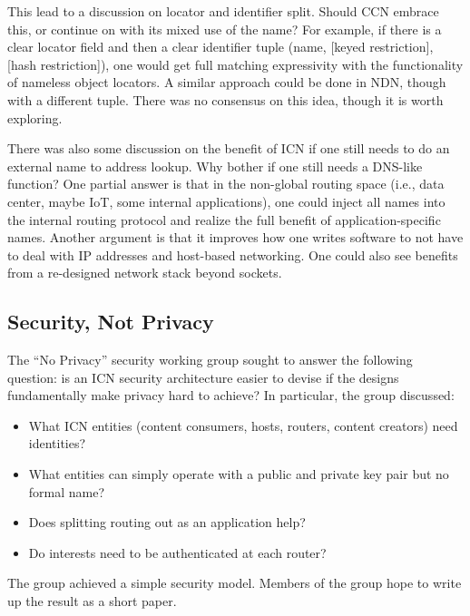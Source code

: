 This lead to a discussion on locator and identifier split.  Should CCN embrace this, or continue on with its mixed use of the name? For example, if there is a clear locator field and then a clear identifier tuple (name, [keyed restriction], [hash restriction]), one would get full matching expressivity with the functionality of nameless object locators.  A similar approach could be done in NDN, though with a different tuple.  There was no consensus on this idea, though it is worth exploring.

There was also some discussion on the benefit of ICN if one still needs to do an external name to address lookup.  Why bother if one still needs a DNS-like function?  One partial answer is that in the non-global routing space (i.e., data center, maybe IoT, some internal applications), one could inject all names into the internal routing protocol and realize the full benefit of application-specific names.  Another argument is that it improves how one writes software to not have to deal with IP addresses and host-based networking. One could also see benefits from a re-designed network stack beyond sockets.

\subsection{Security, Not Privacy}
The ``No Privacy'' security working group sought to answer the following question: is an ICN security architecture easier to devise if the designs fundamentally make privacy hard to achieve? In particular, the group discussed:

\begin{itemize}
\item What ICN entities (content consumers, hosts, routers, content creators) need identities?
\item What entities can simply operate with a public and private key pair but no formal name?
\item Does splitting routing out as an application help?
\item Do interests need to be authenticated at each router?
\end{itemize}

The group achieved a simple security model. Members of the group hope to write up the result as a short paper.
